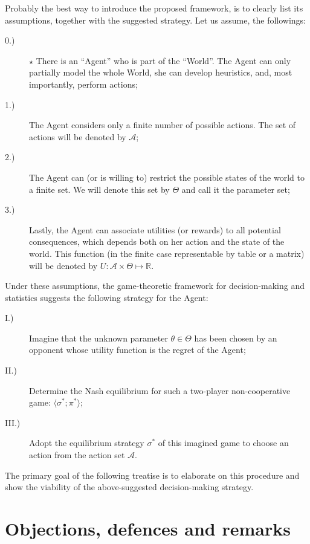 \documentclass{article}
\begin{document}
Probably the best way to introduce the proposed framework, is to clearly list its assumptions, together with the suggested strategy. Let us assume, the followings:

\begin{description}
    \item[0.)] $\star$ There is an ``Agent'' who is part of the ``World''. The Agent can only partially model the whole World, she can develop heuristics, and, most importantly, perform actions;
    \item[1.)] The Agent considers only a finite number of possible actions. The set of actions will be denoted by $\mathcal{A}$;
    \item[2.)] The Agent can (or is willing to) restrict the possible states of the world to a finite set. We will denote this set by $\Theta$ and call it the parameter set;
    \item[3.)] Lastly, the Agent can associate utilities (or rewards) to all potential consequences, which depends both on her action and the state of the world. This function (in the finite case representable by table or a matrix) will be denoted by $U: \mathcal{A} \times \Theta \mapsto \mathbb{R}$.
\end{description}

Under these assumptions, the game-theoretic framework for decision-making and statistics suggests the following strategy for the Agent:

\begin{description}
    \item[I.)] Imagine that the unknown parameter $\theta \in \Theta$ has been chosen by an opponent whose utility function is the regret of the Agent;
    \item[II.)] Determine the Nash equilibrium for such a two-player non-cooperative game: $\langle \sigma^*; \pi^* \rangle$;
    \item[III.)] Adopt the equilibrium strategy $\sigma^*$ of this imagined game to choose an action from the action set $\mathcal{A}$.
\end{description}

The primary goal of the following treatise is to elaborate on this procedure and show the viability of the above-suggested decision-making strategy.


\section*{Objections, defences and remarks}
\end{document}
